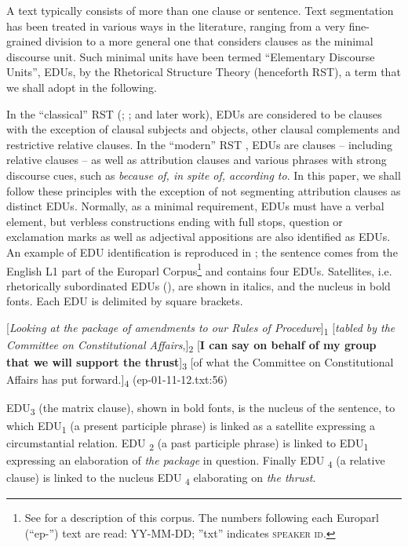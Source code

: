 \documentclass[output=paper]{LSP/langsci}
\begin{document}
A text typically consists of more than one clause or sentence. Text segmentation has been treated in various ways in the literature, ranging from a very fine-grained division to a more general one that considers clauses as the minimal discourse unit. Such minimal units have been termed ``Elementary Discourse Units'', EDUs, by the Rhetorical Structure Theory (henceforth RST), a term that we shall adopt in the following. 

In the ``classical'' RST (\citealt{Mann1987}; \citealt{Mann1992}; \citealt{Matthiessen1988} and later work), EDUs are considered to be clauses with the exception of clausal subjects and objects, other clausal complements and restrictive relative clauses. In the ``modern'' RST \citep{CarlsonEtAl2003}, EDUs are clauses -- including relative clauses -- as well as attribution clauses and various phrases with strong discourse cues, such as \textit{because of, in spite of, according to}. In this paper, we shall follow these principles with the exception of not segmenting attribution clauses as distinct EDUs. Normally, as a minimal requirement, EDUs must have a verbal element, but verbless constructions ending with full stops, question or exclamation marks as well as adjectival appositions are also identified as EDUs. An example of EDU identification is reproduced in ; the sentence comes from the English L1 part of the Europarl Corpus\footnote{See  for a description of this corpus. The numbers following each Europarl (``ep-'') text are read: YY-MM-DD; ''txt'' indicates \textsc{speaker id}.} and contains four EDUs. Satellites, i.e. rhetorically subordinated EDUs (), are shown in italics, and the nucleus in bold fonts. Each EDU is delimited by square brackets.

\ea\label{ex:korzen:1}
\textup{[}\textit{Looking at the package of amendments to our Rules of Procedure}\textup{]}\textup{\textsubscript{1}}\textup{ [}\textit{tabled by the Committee on Constitutional Affairs},\textup{]}\textup{\textsubscript{2}}\textup{ [}\textbf{\textup{I can say on behalf of my group}}\textup{ }\textbf{\textup{that we will support the thrust}}\textup{]}\textup{\textsubscript{3}}\textup{ [}of what\textup{ }the Committee on Constitutional Affairs has put forward.\textup{]}\textup{\textsubscript{4}}\textup{ }\textup{(ep-01-11-12.txt:56)}
\z 

EDU\textsubscript{3} (the matrix clause), shown in bold fonts, is the nucleus of the sentence, to which EDU{\textsubscript{1}} (a present participle phrase) is linked as a satellite expressing a circumstantial relation. EDU {\textsubscript{2}} (a past participle phrase) is linked to EDU{\textsubscript{1}} expressing an elaboration of \textit{the package} in question. Finally EDU {\textsubscript{4}} (a relative clause) is linked to the nucleus EDU {\textsubscript{4}} elaborating on \textit{the thrust}.
\end{document}

